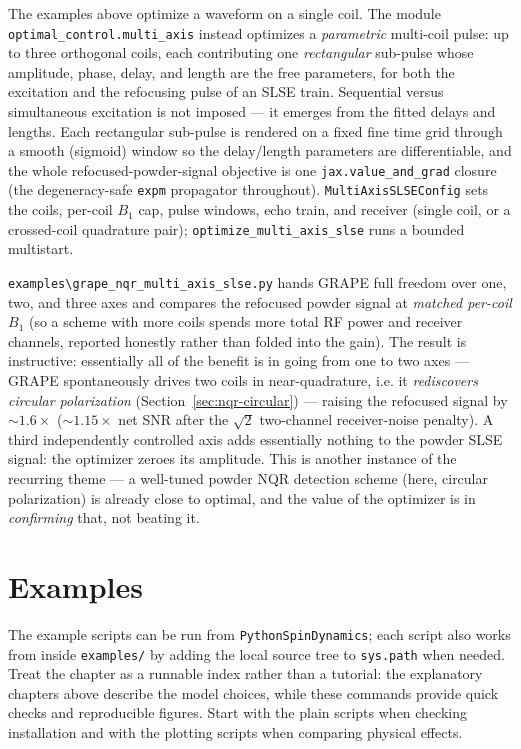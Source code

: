 \documentclass[11pt,oneside]{report}
\newcommand{\code}[1]{\texttt{#1}}
\begin{document}
The examples above optimize a waveform on a single coil. The module
\code{optimal\_control.multi\_axis} instead optimizes a \emph{parametric}
multi-coil pulse: up to three orthogonal coils, each contributing one
\emph{rectangular} sub-pulse whose amplitude, phase, delay, and length are the
free parameters, for both the excitation and the refocusing pulse of an SLSE
train. Sequential versus simultaneous excitation is not imposed --- it emerges
from the fitted delays and lengths. Each rectangular sub-pulse is rendered on a
fixed fine time grid through a smooth (sigmoid) window so the delay/length
parameters are differentiable, and the whole refocused-powder-signal objective is
one \code{jax.value\_and\_grad} closure (the degeneracy-safe \code{expm}
propagator throughout). \code{MultiAxisSLSEConfig} sets the coils, per-coil
\(B_1\) cap, pulse windows, echo train, and receiver (single coil, or a
crossed-coil quadrature pair); \code{optimize\_multi\_axis\_slse} runs a bounded
multistart.

\code{examples\textbackslash grape\_nqr\_multi\_axis\_slse.py} hands GRAPE full
freedom over one, two, and three axes and compares the refocused powder signal at
\emph{matched per-coil} \(B_1\) (so a scheme with more coils spends more total RF
power and receiver channels, reported honestly rather than folded into the gain).
The result is instructive: essentially all of the benefit is in going from one to
two axes --- GRAPE spontaneously drives two coils in near-quadrature, i.e. it
\emph{rediscovers circular polarization} (Section~\ref{sec:nqr-circular}) ---
raising the refocused signal by \(\sim 1.6\times\) (\(\sim 1.15\times\) net SNR
after the \(\sqrt{2}\) two-channel receiver-noise penalty). A third independently
controlled axis adds essentially nothing to the powder SLSE signal: the optimizer
zeroes its amplitude. This is another instance of the recurring theme --- a
well-tuned powder NQR detection scheme (here, circular polarization) is already
close to optimal, and the value of the optimizer is in \emph{confirming} that,
not beating it.

\chapter{Examples}

The example scripts can be run from \code{PythonSpinDynamics}; each script also
works from inside \code{examples/} by adding the local source tree to
\code{sys.path} when needed. Treat the chapter as a runnable index rather than
a tutorial: the explanatory chapters above describe the model choices, while
these commands provide quick checks and reproducible figures. Start with the
plain scripts when checking installation and with the plotting scripts when
comparing physical effects.
\end{document}
